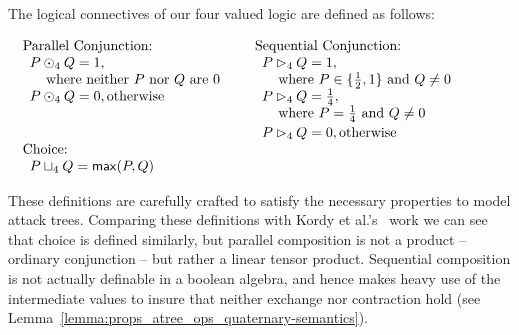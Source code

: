 \begin{definition}
  \label{def:logical-connectives}
  The logical connectives of our four valued logic are defined as
  follows:\vspace{-5px}  
    \begin{center}
      \begin{math}
        \setlength{\arraycolsep}{5px}
        \begin{array}{lll}
          \begin{array}{lll}
            \text{Parallel Conjunction:}\\
            \begin{array}{lll}
              P \odot_4 Q = 1,\\
              \,\,\,\,\,\,\,\text{where neither $P$ nor $Q$ are $0$}\\
              P \odot_4 Q = 0, \text{otherwise}\\
              \\\\[2px]
            \end{array}
            \\[14px]
          \end{array}
          &
          \begin{array}{lll}
            \text{Sequential Conjunction:}\\
            \begin{array}{lll}          
              P \rhd_4 Q = 1,\\
              \,\,\,\,\,\,\,\text{where } P \in \{\half, 1\} \text{ and } Q \neq 0\\
              P \rhd_4 Q = \forth, \\
              \,\,\,\,\,\,\,\text{where $P = \forth$ and $Q \neq 0$}\\[2px]         
              P \rhd_4 Q = 0, \text{otherwise}
            \end{array}
          \end{array}
          \\
          \begin{array}{lll}
            \text{Choice:}\\    
            \begin{array}{lll}
              P \sqcup_4 Q = \mathsf{max}(P,Q)
            \end{array}
          \end{array}
        \end{array}
      \end{math}
    \end{center}        
\end{definition}
These definitions are carefully crafted to satisfy the necessary
properties to model attack trees.  Comparing these definitions with
Kordy et al.'s~\cite{Kordy:2012} work we can see that choice is
defined similarly, but parallel composition is not a product --
ordinary conjunction -- but rather a linear tensor product. Sequential
composition is not actually definable in a boolean algebra, and hence
makes heavy use of the intermediate values to insure that neither
exchange nor contraction hold (see
Lemma~\ref{lemma:props_atree_ops_quaternary-semantics}).

